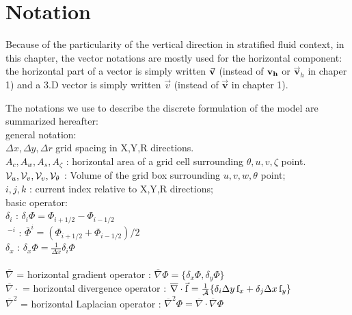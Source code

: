 
\section{Notation} 

Because of the particularity of the vertical direction in stratified fluid
context, in this chapter, the vector notations are mostly used
for the horizontal component:
the horizontal part of a vector is simply written 
$\vec{\bf v}$ (instead of ${\bf v_h}$ or $\vec{\mathbf{v}}_{h}$ in chaper 1)
and a 3.D vector is simply written $\vec{v}$ (instead of $\vec{\mathbf{v}}$ 
in chapter 1).

The notations we use to describe the discrete formulation 
of the model are summarized hereafter:\\
general notation:
\\ $\Delta x, \Delta y, \Delta r$ grid spacing in X,Y,R directions.
\\ $A_c,A_w,A_s,A_{\zeta}$ : 
horizontal area of a grid cell surrounding $\theta,u,v,\zeta$ point.
\\ ${\cal V}_u , {\cal V}_v , {\cal V}_v , {\cal V}_\theta$ :
Volume of the grid box surrounding $u,v,w,\theta$ point;
\\ $i,j,k$ : current index relative to X,Y,R directions;
\\basic operator:
\\ $\delta_i $ : $\delta_i \Phi = \Phi_{i+1/2} - \Phi_{i-1/2} $
\label{eq:delta_i}
\\ $~^{-i}$ : $\overline{\Phi}^i = ( \Phi_{i+1/2} + \Phi_{i-1/2} ) / 2 $ 
\label{eq:bar_i}
\\ $\delta_x $ : $\delta_x \Phi = \frac{1}{\Delta x} \delta_i \Phi $
\label{eq:delta_x}
\\
\\ $\overline{\nabla}$ = horizontal gradient operator :  
$\overline{\nabla} \Phi = \{ \delta_x \Phi , \delta_y \Phi \}$
\label{eq:d_grad}
\\ $\overline{\nabla} \cdot$ = horizontal divergence operator :  
$\overline{\nabla}\cdot \vec{\mathrm{f}}  = 
\frac{1}{\cal A} \{ \delta_i \Delta y \, \mathrm{f}_x 
                  + \delta_j \Delta x \, \mathrm{f}_y \} $
\label{eq:d_div}
\\ $\overline{\nabla}^2 $ = horizontal Laplacian operator :
$ \overline{\nabla}^2 \Phi = 
   \overline{\nabla}\cdot \overline{\nabla}\Phi $
\label{eq:d_lap}
